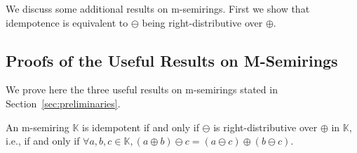  We discuss some
additional results on m-semirings. First we show that idempotence is equivalent to $\ominus$ being right-distributive over $\oplus$.
\begin{toappendix}
  \subsection{Proofs of the Useful Results on M-Semirings}
  We prove here the three useful results on m-semirings stated in
  Section~\ref{sec:preliminaries}.
\end{toappendix}
\begin{propositionrep}\label{prop:idempotent_iff_add_monus}
  An m-semiring $\mathbb K$ is idempotent if and only if $\ominus$
  is right-distributive over $\oplus$ in $\mathbb K$, i.e., if and only
  if $\forall a, b,
c\in\mathbb K, (a\oplus b)\ominus c=(a\ominus c)\oplus (b\ominus c)$.
\end{propositionrep}
